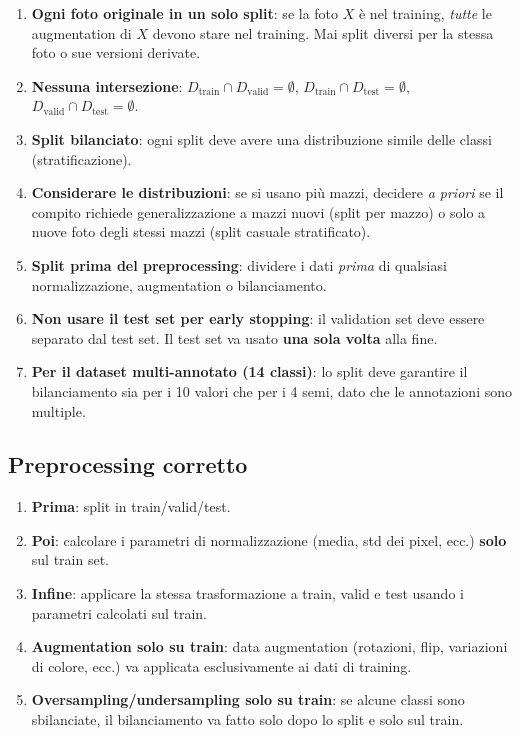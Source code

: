 \documentclass[a4paper,12pt]{article}
\begin{document}
\begin{enumerate}[label=\textbf{S\arabic*.}]
    \item \textbf{Ogni foto originale in un solo split}: se la foto $X$ è nel training, \emph{tutte} le augmentation di $X$ devono stare nel training. Mai split diversi per la stessa foto o sue versioni derivate.
    
    \item \textbf{Nessuna intersezione}: $D_{\text{train}} \cap D_{\text{valid}} = \emptyset$, $D_{\text{train}} \cap D_{\text{test}} = \emptyset$, $D_{\text{valid}} \cap D_{\text{test}} = \emptyset$.
    
    \item \textbf{Split bilanciato}: ogni split deve avere una distribuzione simile delle classi (stratificazione).
    
    \item \textbf{Considerare le distribuzioni}: se si usano più mazzi, decidere \emph{a priori} se il compito richiede generalizzazione a mazzi nuovi (split per mazzo) o solo a nuove foto degli stessi mazzi (split casuale stratificato).
    
    \item \textbf{Split prima del preprocessing}: dividere i dati \emph{prima} di qualsiasi normalizzazione, augmentation o bilanciamento.
    
    \item \textbf{Non usare il test set per early stopping}: il validation set deve essere separato dal test set. Il test set va usato \textbf{una sola volta} alla fine.
    
    \item \textbf{Per il dataset multi-annotato (14 classi)}: lo split deve garantire il bilanciamento sia per i 10 valori che per i 4 semi, dato che le annotazioni sono multiple.
\end{enumerate}

\subsection{Preprocessing corretto}

\begin{enumerate}[label=\textbf{P\arabic*.}]
    \item \textbf{Prima}: split in train/valid/test.
    \item \textbf{Poi}: calcolare i parametri di normalizzazione (media, std dei pixel, ecc.) \textbf{solo} sul train set.
    \item \textbf{Infine}: applicare la stessa trasformazione a train, valid e test usando i parametri calcolati sul train.
    \item \textbf{Augmentation solo su train}: data augmentation (rotazioni, flip, variazioni di colore, ecc.) va applicata esclusivamente ai dati di training.
    \item \textbf{Oversampling/undersampling solo su train}: se alcune classi sono sbilanciate, il bilanciamento va fatto solo dopo lo split e solo sul train.
\end{enumerate}
\end{document}
